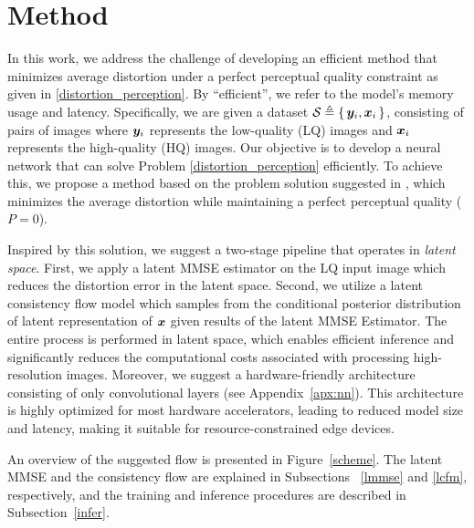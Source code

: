 \section{Method}

In this work, we address the challenge of developing an efficient method that minimizes average distortion under a perfect perceptual quality constraint as given in \eqref{distortion_perception}.  By ``efficient'', we refer to the model's memory usage and latency. Specifically, we are given a dataset  $\mathcal{S}\triangleq\set{\bm{y}_i,\bm{x}_i}$, consisting of pairs of images where $\bm{y}_i$ represents the low-quality (LQ) images and $\bm{x}_i$ represents the high-quality (HQ) images. Our objective is to develop a neural network that can solve Problem \eqref{distortion_perception} efficiently. To achieve this, we propose a method based on the problem solution suggested in \citet{freirich2021a}, which minimizes the average distortion while maintaining a perfect perceptual quality ($P=0$). 


Inspired by this solution, we suggest a two-stage pipeline that operates in \emph{latent space}. First, we apply a latent MMSE estimator on the LQ input image which reduces the distortion error in the latent space. Second, we utilize a latent consistency flow model which samples from the conditional posterior distribution of latent representation of $\bm{x}$ given results of the latent MMSE Estimator. The entire process is performed in latent space, which enables efficient inference and significantly reduces the computational costs associated with processing high-resolution images. Moreover, we suggest a hardware-friendly architecture consisting of only convolutional layers (see Appendix~\ref{apx:nn}). This architecture is highly optimized for most hardware accelerators, leading to reduced model size and latency, making it suitable for resource-constrained edge devices.

An overview of the suggested flow is presented in Figure~\ref{scheme}. The latent MMSE and the consistency flow are explained in Subsections ~\ref{lmmse} and \ref{lcfm}, respectively, and the training and inference procedures are described in Subsection~\ref{infer}.




